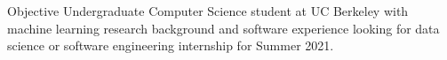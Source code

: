 \begin{rSection}{Objective}
Undergraduate Computer Science student at UC Berkeley with machine learning research background and software experience looking for data science or software engineering internship for Summer 2021.
\end{rSection}